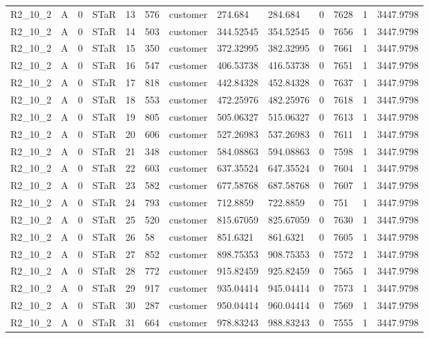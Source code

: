 \begin{longtable}{lllllllllllll}
R2\_10\_2 & A & 0 & STaR & 13 & 576 & customer & 274.684 & 284.684 & 0 & 7628 & 1 & 3447.9798 \\
R2\_10\_2 & A & 0 & STaR & 14 & 503 & customer & 344.52545 & 354.52545 & 0 & 7656 & 1 & 3447.9798 \\
R2\_10\_2 & A & 0 & STaR & 15 & 350 & customer & 372.32995 & 382.32995 & 0 & 7661 & 1 & 3447.9798 \\
R2\_10\_2 & A & 0 & STaR & 16 & 547 & customer & 406.53738 & 416.53738 & 0 & 7651 & 1 & 3447.9798 \\
R2\_10\_2 & A & 0 & STaR & 17 & 818 & customer & 442.84328 & 452.84328 & 0 & 7637 & 1 & 3447.9798 \\
R2\_10\_2 & A & 0 & STaR & 18 & 553 & customer & 472.25976 & 482.25976 & 0 & 7618 & 1 & 3447.9798 \\
R2\_10\_2 & A & 0 & STaR & 19 & 805 & customer & 505.06327 & 515.06327 & 0 & 7613 & 1 & 3447.9798 \\
R2\_10\_2 & A & 0 & STaR & 20 & 606 & customer & 527.26983 & 537.26983 & 0 & 7611 & 1 & 3447.9798 \\
R2\_10\_2 & A & 0 & STaR & 21 & 348 & customer & 584.08863 & 594.08863 & 0 & 7598 & 1 & 3447.9798 \\
R2\_10\_2 & A & 0 & STaR & 22 & 603 & customer & 637.35524 & 647.35524 & 0 & 7604 & 1 & 3447.9798 \\
R2\_10\_2 & A & 0 & STaR & 23 & 582 & customer & 677.58768 & 687.58768 & 0 & 7607 & 1 & 3447.9798 \\
R2\_10\_2 & A & 0 & STaR & 24 & 793 & customer & 712.8859 & 722.8859 & 0 & 751 & 1 & 3447.9798 \\
R2\_10\_2 & A & 0 & STaR & 25 & 520 & customer & 815.67059 & 825.67059 & 0 & 7630 & 1 & 3447.9798 \\
R2\_10\_2 & A & 0 & STaR & 26 & 58 & customer & 851.6321 & 861.6321 & 0 & 7605 & 1 & 3447.9798 \\
R2\_10\_2 & A & 0 & STaR & 27 & 852 & customer & 898.75353 & 908.75353 & 0 & 7572 & 1 & 3447.9798 \\
R2\_10\_2 & A & 0 & STaR & 28 & 772 & customer & 915.82459 & 925.82459 & 0 & 7565 & 1 & 3447.9798 \\
R2\_10\_2 & A & 0 & STaR & 29 & 917 & customer & 935.04414 & 945.04414 & 0 & 7573 & 1 & 3447.9798 \\
R2\_10\_2 & A & 0 & STaR & 30 & 287 & customer & 950.04414 & 960.04414 & 0 & 7569 & 1 & 3447.9798 \\
R2\_10\_2 & A & 0 & STaR & 31 & 664 & customer & 978.83243 & 988.83243 & 0 & 7555 & 1 & 3447.9798 \\

\end{longtable}
